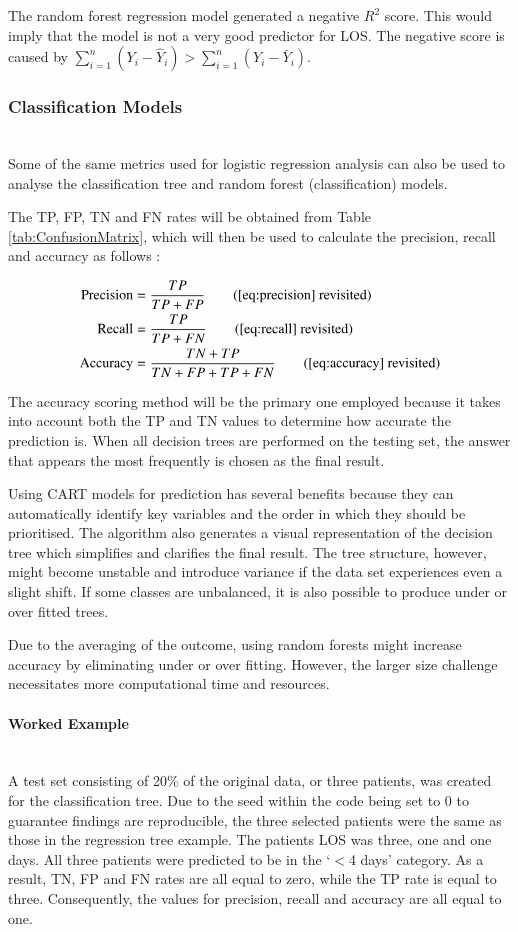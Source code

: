 \documentclass[../thesis.tex]{subfiles}
\begin{document}
The random forest regression model generated a negative $R^{2}$ score. This would imply that the model is not a very good predictor for LOS. The negative score is caused by $\sum^n_{i=1} (Y_{i}- \hat{Y}_{i}) >\sum^{n}_{i=1} (Y_{i} -\bar{Y}_{i})$.


\subsubsection{Classification Models}\\
Some of the same metrics used for logistic regression analysis can also be used to analyse the classification tree and random forest (classification) models.

The TP, FP, TN and FN rates will be obtained from Table \ref{tab:ConfusionMatrix}, which will then be used to calculate the precision, recall and accuracy as follows \cite{Baratloo2015}:

\begin{align}
    \text{Precision} &= \frac{TP}{TP + FP}\tag{\ref{eq:precision} revisited}\\
    \text{Recall} &= \frac{TP}{TP + FN}\tag{\ref{eq:recall} revisited}\\
    \text{Accuracy} &= \frac{TN + TP}{TN + FP + TP + FN} \tag{\ref{eq:accuracy} revisited}
\end{align}

The accuracy scoring method will be the primary one employed because it takes into account both the TP and TN values to determine how accurate the prediction is. When all decision trees are performed on the testing set, the answer that appears the most frequently is chosen as the final result.

Using CART models for prediction has several benefits because they can automatically identify key variables and the order in which they should be prioritised. The algorithm also generates a visual representation of the decision tree which simplifies and clarifies the final result. The tree structure, however, might become unstable and introduce variance if the data set experiences even a slight shift. If some classes are unbalanced, it is also possible to produce under or over fitted trees.

Due to the averaging of the outcome, using random forests might increase accuracy by eliminating under or over fitting. However, the larger size challenge necessitates more computational time and resources.
\paragraph{Worked Example}\\
A test set consisting of 20\% of the original data, or three patients, was created for the classification tree. Due to the seed within the code being set to 0 to guarantee findings are reproducible, the three selected patients were the same as those in the regression tree example.
The patients LOS was three, one and one days. All three patients were predicted to be in the `$<$4 days' category. As a result, TN, FP and FN rates are all equal to zero, while the TP rate is equal to three. Consequently, the values for precision, recall and accuracy are all equal to one.
\end{document}
